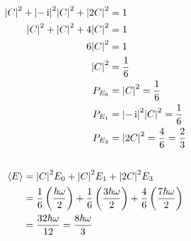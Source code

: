\subsection{}
\begin{align*}
    \abs{C}^2 + \abs{-\operatorname{i}}^2 \abs{C}^2 + \abs{2C}^2 & = 1\\
    \abs{C}^2 + \abs{C}^2 + 4 \abs{C}^2 & = 1\\
    6 \abs{C}^2 & = 1\\
    \abs{C}^2 & = \frac{1}{6}\\
    P_{E_0} & = \abs{C}^2 = \frac{1}{6}\\
    P_{E_1} & = \abs{-\operatorname{i}}^2 \abs{C}^2 = \frac{1}{6}\\
    P_{E_3} & = \abs{2C}^2 = \frac{4}{6} = \frac{2}{3}
\end{align*}

\subsection{}
\begin{align*}
    \expectationvalue{E} & = \abs{C}^2 E_0 + \abs{C}^2 E_1 + \abs{2C}^2 E_3\\
    & = \frac{1}{6} \del{\frac{\hbar \omega}{2}} + \frac{1}{6} \del{\frac{3 \hbar \omega}{2}} + \frac{4}{6} \del{\frac{7 \hbar \omega}{2}}\\
    & = \frac{32 \hbar \omega}{12} = \frac{8 \hbar \omega}{3}
\end{align*}